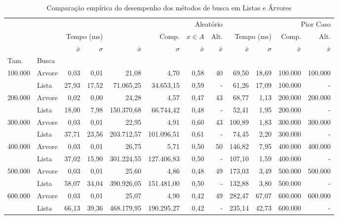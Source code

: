 \begin{table}
\caption{Comparação empírica do desempenho dos métodos de busca em Listas e Árvores}
\label{tab:resultados_listas_arvores}
\begin{tabular}{llrrrrrrrrrr}
\toprule
 &  & \multicolumn{6}{r}{Aleatório} & \multicolumn{4}{r}{Pior Caso} \\
 &  & \multicolumn{2}{r}{Tempo (ms)} & \multicolumn{2}{r}{Comp.} & $x \in A$ & Alt. & \multicolumn{2}{r}{Tempo (ms)} & Comp. & Alt. \\
 &  & $\bar{x}$ & $\sigma$ & $\bar{x}$ & $\sigma$ & $\bar{x}$ & $\bar{x}$ & $\bar{x}$ & $\sigma$ & $\bar{x}$ & $\bar{x}$ \\
Tam. & Busca &  &  &  &  &  &  &  &  &  &  \\
\midrule
\multirow[c]{2}{*}{100.000} & Arvore & 0,03 & 0,01 & 21,08 & 4,70 & 0,58 & 40 & 69,50 & 18,69 & 100.000 & 100.000 \\
 & Lista & 27,93 & 17,52 & 71.065,25 & 34.653,15 & 0,59 & - & 61,26 & 17,09 & 100.000 & - \\
\cline{1-12}
\multirow[c]{2}{*}{200.000} & Arvore & 0,02 & 0,00 & 24,28 & 4,57 & 0,47 & 43 & 68,77 & 1,13 & 200.000 & 200.000 \\
 & Lista & 18,00 & 7,98 & 150.370,68 & 66.744,42 & 0,48 & - & 52,41 & 1,95 & 200.000 & - \\
\cline{1-12}
\multirow[c]{2}{*}{300.000} & Arvore & 0,03 & 0,01 & 22,95 & 4,91 & 0,60 & 43 & 100,89 & 1,83 & 300.000 & 300.000 \\
 & Lista & 37,71 & 23,56 & 203.712,57 & 101.096,51 & 0,61 & - & 74,45 & 2,20 & 300.000 & - \\
\cline{1-12}
\multirow[c]{2}{*}{400.000} & Arvore & 0,03 & 0,01 & 26,75 & 5,71 & 0,50 & 50 & 146,82 & 7,95 & 400.000 & 400.000 \\
 & Lista & 37,02 & 15,90 & 301.224,55 & 127.406,83 & 0,50 & - & 107,10 & 1,59 & 400.000 & - \\
\cline{1-12}
\multirow[c]{2}{*}{500.000} & Arvore & 0,03 & 0,01 & 25,60 & 4,86 & 0,48 & 49 & 173,03 & 3,49 & 500.000 & 500.000 \\
 & Lista & 58,07 & 34,04 & 390.926,05 & 151.481,00 & 0,50 & - & 132,88 & 3,80 & 500.000 & - \\
\cline{1-12}
\multirow[c]{2}{*}{600.000} & Arvore & 0,03 & 0,01 & 25,07 & 4,90 & 0,42 & 49 & 282,47 & 67,07 & 600.000 & 600.000 \\
 & Lista & 66,13 & 39,36 & 468.179,95 & 190.295,27 & 0,42 & - & 235,14 & 42,73 & 600.000 & - \\

\end{tabular}
\end{table}

